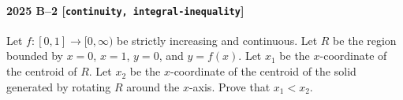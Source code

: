 \paragraph{2025 B--2 \textnormal{[\texttt{continuity, integral-inequality}]}}
Let $f\colon [0,1] \to [0, \infty)$ be strictly increasing and continuous. Let $R$ be the region bounded by $x=0$, $x=1$, $y=0$, and $y=f(x)$. Let $x_1$ be the $x$-coordinate of the centroid of $R$. Let $x_2$ be the $x$-coordinate of the centroid of the solid generated by rotating $R$ around the $x$-axis. Prove that $x_1 < x_2$.


